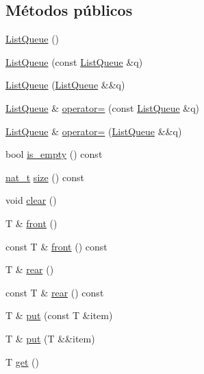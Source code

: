 \subsection*{Métodos públicos}
\begin{DoxyCompactItemize}
\item 
\hyperlink{class_designar_1_1_list_queue_a873b7115c57ffc8b3bb812df2727041f}{List\+Queue} ()
\item 
\hyperlink{class_designar_1_1_list_queue_aa7539c8b5a199916b2013ea4072eac38}{List\+Queue} (const \hyperlink{class_designar_1_1_list_queue}{List\+Queue} \&q)
\item 
\hyperlink{class_designar_1_1_list_queue_a959df61146e0642a0ee24227b257e470}{List\+Queue} (\hyperlink{class_designar_1_1_list_queue}{List\+Queue} \&\&q)
\item 
\hyperlink{class_designar_1_1_list_queue}{List\+Queue} \& \hyperlink{class_designar_1_1_list_queue_aed4d7cad2e706202054746bf4f934903}{operator=} (const \hyperlink{class_designar_1_1_list_queue}{List\+Queue} \&q)
\item 
\hyperlink{class_designar_1_1_list_queue}{List\+Queue} \& \hyperlink{class_designar_1_1_list_queue_ae0ee7a8cf8b7cbf8f89a268db1a448dc}{operator=} (\hyperlink{class_designar_1_1_list_queue}{List\+Queue} \&\&q)
\item 
bool \hyperlink{class_designar_1_1_list_queue_a0d21739ee62997c7b7a35fb7583e1629}{is\+\_\+empty} () const
\item 
\hyperlink{namespace_designar_aa72662848b9f4815e7bf31a7cf3e33d1}{nat\+\_\+t} \hyperlink{class_designar_1_1_list_queue_a0a2d3a25c27b0529b1bcc4b0c0b27855}{size} () const
\item 
void \hyperlink{class_designar_1_1_list_queue_aaca43c7f4dc964e05e5bb4af01efc389}{clear} ()
\item 
T \& \hyperlink{class_designar_1_1_list_queue_aa7fc9ba1a7fb8e65819be9da7f96e106}{front} ()
\item 
const T \& \hyperlink{class_designar_1_1_list_queue_abfc6bf50f4b4158e735ccd2c2d49ab1b}{front} () const
\item 
T \& \hyperlink{class_designar_1_1_list_queue_a04064adf41dec656de3dfa66a72c9f22}{rear} ()
\item 
const T \& \hyperlink{class_designar_1_1_list_queue_af3e54cd6e13b28f49dde38881f0a737f}{rear} () const
\item 
T \& \hyperlink{class_designar_1_1_list_queue_aff798fc666bdf94771a60fa291f12a5e}{put} (const T \&item)
\item 
T \& \hyperlink{class_designar_1_1_list_queue_a6a8469ab0fc0ddc5e01a067374772ac2}{put} (T \&\&item)
\item 
T \hyperlink{class_designar_1_1_list_queue_a4b934d649cd814fff5ec643843b8245d}{get} ()
\end{DoxyCompactItemize}


